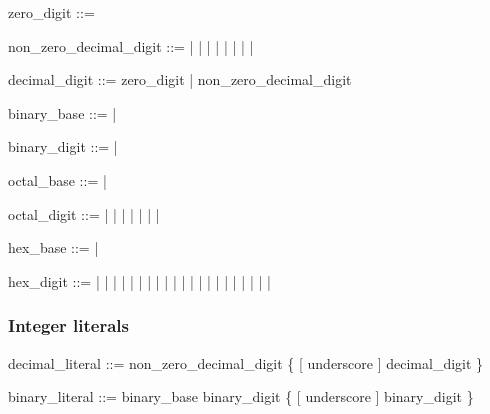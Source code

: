 \begin{bnf}
zero\_digit ::= 
\end{bnf}

\begin{bnf}
non\_zero\_decimal\_digit ::=  |  |  |  |  |  |  |  | 
\end{bnf}

\begin{bnf}
decimal\_digit ::= zero\_digit | non\_zero\_decimal\_digit
\end{bnf}

\begin{bnf}
binary\_base ::=  | 
\end{bnf}

\begin{bnf}
binary\_digit ::=  | 
\end{bnf}

\begin{bnf}
octal\_base ::=  | 
\end{bnf}

\begin{bnf}
octal\_digit ::=  |  |  |  |  |  |  | 
\end{bnf}

\begin{bnf}
hex\_base ::=  | 
\end{bnf}

\begin{bnf}
hex\_digit ::=  |  |  |  |  |  |  |  |  |  |  |  |  |  |  |  |  |  |  |  |  | 
\end{bnf}

\subsubsection{Integer literals}

\begin{bnf}
decimal\_literal ::=  non\_zero\_decimal\_digit \{ [ underscore ] decimal\_digit \}
\end{bnf}

\begin{bnf}
binary\_literal ::= binary\_base  binary\_digit \{ [ underscore ] binary\_digit \}
\end{bnf}

